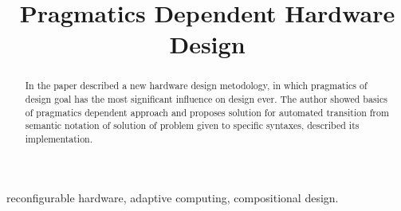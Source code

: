 \documentclass[a4paper,conference]{IEEEtran}
\begin{document}
%
\title{Pragmatics Dependent Hardware Design}


\author{
}

\maketitle


\begin{abstract}
In the paper described a new hardware design metodology, in which pragmatics of design goal has the most significant influence on design ever. The author showed  basics of pragmatics dependent approach and proposes solution for automated transition from semantic notation of solution of problem given to specific syntaxes, described its implementation.
\end{abstract}

\begin{keywords}
reconfigurable hardware, adaptive computing, compositional design.
\end{keywords}

\IEEEpeerreviewmaketitle






\end{document}
